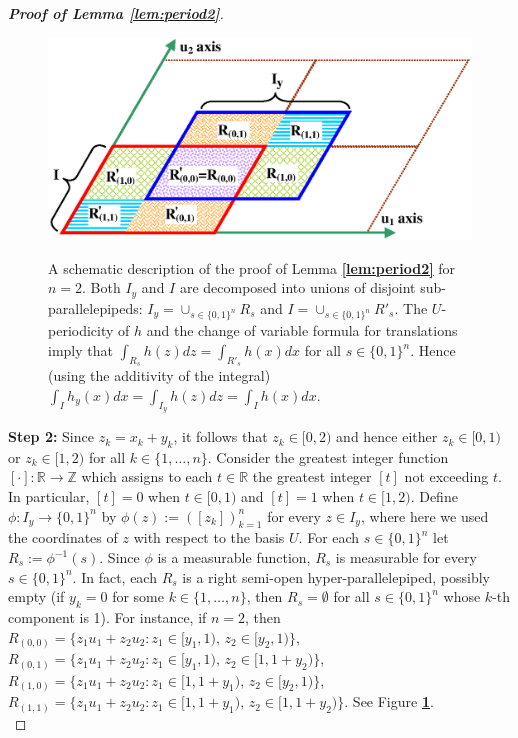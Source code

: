 \documentclass[12 pt]{amsart}
\theoremstyle{definition}
\newcommand{\R}{\mathbb{R}}
\newcommand{\Z}{\mathbb{Z}}
\newcommand{\bref}[1]{\textbf{\ref{#1}}} %
\begin{document}
\begin{proof}[{\bf Proof of Lemma \bref{lem:period2}}]
\begin{figure}[t]
\begin{minipage}[t]{1\textwidth}
\begin{center}
{\includegraphics[clip, scale=0.55]{ParallelPeriod.eps}}
\end{center}
 \caption{A schematic description of the proof of Lemma \bref{lem:period2} for $n=2$. Both $I_y$ and $I$ are decomposed into unions of disjoint sub-parallelepipeds: $I_y=\cup_{s\in\{0,1\}^n}R_s$ and $I=\cup_{s\in\{0,1\}^n}R'_s$. The $U$-periodicity of $h$ and the change of variable formula for translations imply that  $\int_{R_s}h(z)dz=\int_{R'_s}h(x)dx$ for all $s\in\{0,1\}^n$. Hence (using the additivity of the integral) $\int_{I}h_y(x)dx=\int_{I_y}h(z)dz=\int_I h(x)dx$.}
\label{fig:ParallelPeriod}
\end{minipage}
\end{figure}
 
{\noindent \bf Step 2:}  Since $z_k=x_k+y_k$, it follows that $z_k\in [0,2)$ and hence either $z_k\in [0,1)$ or $z_k\in [1,2)$ for all $k\in\{1,\ldots,n\}$. Consider the greatest integer function $[\cdot]:\R\to\Z$ which assigns to each $t\in \R$ the greatest integer $[t]$ not exceeding $t$. In particular, $[t]=0$ when $t\in [0,1)$ and $[t]=1$ when $t\in [1,2)$. Define $\phi: I_y\to\{0,1\}^n$ by $\phi(z):=([z_k])_{k=1}^n$ for every $z\in I_y$, where here we used the coordinates of $z$ with respect to the basis $U$. For each $s\in \{0,1\}^n$ let $R_s:=\phi^{-1}(s)$. Since  $\phi$ is a measurable function, $R_s$ is measurable for every $s\in \{0,1\}^n$. In fact, each $R_s$ is a right semi-open hyper-parallelepiped, possibly empty (if $y_k=0$ for some $k\in\{1,\ldots,n\}$, then $R_s=\emptyset$ for all $s\in\{0,1\}^n$ whose $k$-th component is 1). For instance, if $n=2$, then 
$R_{(0,0)}=\{z_1 u_1+z_2 u_2: z_1\in [y_1,1),\,z_2\in [y_2,1)\}$, 
$R_{(0,1)}=\{z_1 u_1+z_2 u_2: z_1\in [y_1,1),\,z_2\in [1,1+y_2)\}$, 
$R_{(1,0)}=\{z_1 u_1+z_2 u_2: z_1\in [1,1+y_1),\,z_2\in [y_2,1)\}$, 
$R_{(1,1)}=\{z_1 u_1+z_2 u_2: z_1\in [1,1+y_1),\,z_2\in [1,1+y_2)\}$. See Figure \bref{fig:ParallelPeriod}.\\


\end{proof}
\end{document}
